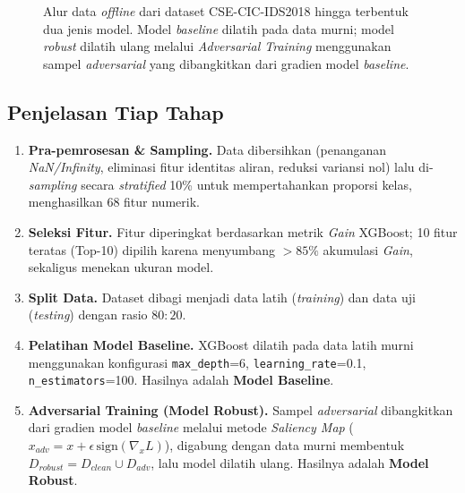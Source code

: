 \documentclass[11pt, a4paper]{article}
\begin{document}
\begin{figure}[htbp]
{%
}
\caption{Alur data \textit{offline} dari dataset CSE-CIC-IDS2018 hingga terbentuk dua jenis model. Model \textit{baseline} dilatih pada data murni; model \textit{robust} dilatih ulang melalui \textit{Adversarial Training} menggunakan sampel \textit{adversarial} yang dibangkitkan dari gradien model \textit{baseline}.}
\label{fig:pipeline_model}
\end{figure}

\subsection{Penjelasan Tiap Tahap}
\begin{enumerate}[leftmargin=1.4cm]
    \item \textbf{Pra-pemrosesan \& Sampling.} Data dibersihkan (penanganan \textit{NaN/Infinity}, eliminasi fitur identitas aliran, reduksi variansi nol) lalu di-\textit{sampling} secara \textit{stratified} 10\% untuk mempertahankan proporsi kelas, menghasilkan 68 fitur numerik.
    \item \textbf{Seleksi Fitur.} Fitur diperingkat berdasarkan metrik \textit{Gain} XGBoost; 10 fitur teratas (Top-10) dipilih karena menyumbang $>85\%$ akumulasi \textit{Gain}, sekaligus menekan ukuran model.
    \item \textbf{Split Data.} Dataset dibagi menjadi data latih (\textit{training}) dan data uji (\textit{testing}) dengan rasio $80:20$.
    \item \textbf{Pelatihan Model Baseline.} XGBoost dilatih pada data latih murni menggunakan konfigurasi \texttt{max\_depth}=6, \texttt{learning\_rate}=0.1, \texttt{n\_estimators}=100. Hasilnya adalah \textbf{Model Baseline}.
    \item \textbf{Adversarial Training (Model Robust).} Sampel \textit{adversarial} dibangkitkan dari gradien model \textit{baseline} melalui metode \textit{Saliency Map} ($x_{adv}=x+\epsilon\,\mathrm{sign}(\nabla_x L)$), digabung dengan data murni membentuk $D_{robust}=D_{clean}\cup D_{adv}$, lalu model dilatih ulang. Hasilnya adalah \textbf{Model Robust}.
\end{enumerate}
\end{document}

